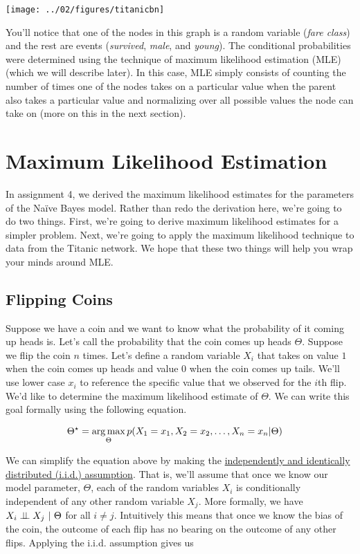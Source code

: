 \documentclass[review_Solutions]{subfiles}
\begin{document}
\begin{center}
\texttt{[image: ../02/figures/titanicbn]}
\end{center}

You'll notice that one of the nodes in this graph is a random variable (\emph{fare class}) and the rest are events (\emph{survived}, \emph{male}, and \emph{young}).  The conditional probabilities were determined using the technique of maximum likelihood estimation (MLE) (which we will describe later).  In this case, MLE simply consists of counting the number of times one of the nodes takes on a particular value when the parent also takes a particular value and normalizing over all possible values the node can take on (more on this in the next section).

\section{Maximum Likelihood Estimation}

In assignment 4, we derived the maximum likelihood estimates for the parameters of the Na\"ive Bayes model.  Rather than redo the derivation here, we're going to do two things.  First, we're going to derive maximum likelihood estimates for a simpler problem.  Next, we're going to apply the maximum likelihood technique to data from the Titanic network.  We hope that these two things will help you wrap your minds around MLE.

\subsection{Flipping Coins}

Suppose we have a coin and we want to know what the probability of it coming up heads is.  Let's call the probability that the coin comes up heads $\Theta$.  Suppose we flip the coin $n$ times.  Let's define a random variable $X_i$ that takes on value $1$ when the coin comes up heads and value $0$ when the coin comes up tails.  We'll use lower case $x_i$ to reference the specific value that we observed for the $i$th flip.  We'd like to determine the maximum likelihood estimate of $\Theta$.  We can write this goal formally using the following equation.


\begin{align}
\Theta^\star &= \operatorname*{arg\,max}_{\Theta} p(X_1 = x_1, X_2 = x_2, \ldots, X_n = x_n | \Theta)
\end{align} 

We can simplify the equation above by making the \href{https://en.wikipedia.org/wiki/Independent_and_identically_distributed_random_variables}{independently and identically distributed (i.i.d.) assumption}.  That is, we'll assume that once we know our model parameter, $\Theta$, each of the random variables $X_i$ is conditionally independent of any other random variable $X_j$.  More formally, we have $X_i \perp\!\!\!\perp X_j~|~\Theta$ for all $i \neq j$.  Intuitively this means that once we know the bias of the coin, the outcome of each flip has no bearing on the outcome of any other flips.  Applying the i.i.d. assumption gives us
\end{document}
